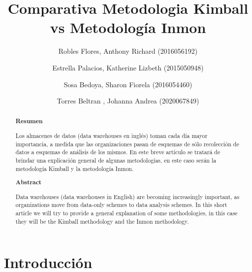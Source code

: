 \documentclass[%
 reprint,
 amsmath,amssymb,
 aps,
]{revtex4-1}
\begin{document}
\title{Comparativa Metodologia Kimball vs Metodología Inmon}
\author{Robles Flores, Anthony Richard	               (2016056192)}
\author{Estrella Palacios, Katherine Lizbeth			(2015050948)}
\author{Sosa Bedoya, Sharon Fiorela					(2016054460)}
\author{Torres Beltran , Johanna Andrea				(2020067849)}

		
%

\begin{abstract}
\begin{center}
\textbf{Resumen}
\end{center}
Los almacenes de datos (data warehouses en inglés) toman cada día mayor importancia, a medida que las organizaciones pasan de esquemas de sólo recolección de datos a esquemas de análisis de los mismos. En este breve artículo se  tratará de brindar una explicación general de algunas metodologías, en este caso serán la metodología Kimball y la metodología Inmon.
\\

\begin{center}
\textbf{Abstract}
\end{center}
Data warehouses (data warehouses in English) are becoming increasingly important, as organizations move from data-only schemes to data analysis schemes. In this short article we will try to provide a general explanation of some methodologies, in this case they will be the Kimball methodology and the Inmon methodology.
\\
\end{abstract}



\maketitle


\section {Introducción}\label{sec:1}
\end{document}
